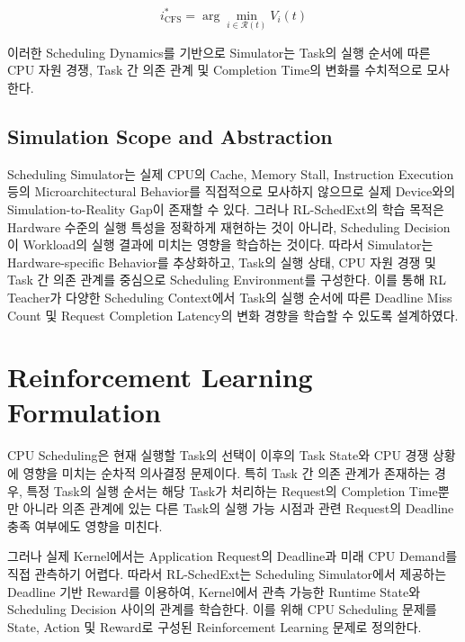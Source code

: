 \begin{equation}
    i^*_{\mathrm{CFS}}
    =
    \arg\min_{i \in \mathcal{R}(t)} V_i(t)
\end{equation}

이러한 Scheduling Dynamics를 기반으로 Simulator는
Task의 실행 순서에 따른 CPU 자원 경쟁, Task 간 의존 관계
및 Completion Time의 변화를 수치적으로 모사한다.

\subsection{Simulation Scope and Abstraction}
\label{sec:design-simulation-scope-and-abstraction}

Scheduling Simulator는 실제 CPU의 Cache, Memory Stall,
Instruction Execution 등의 Microarchitectural Behavior를
직접적으로 모사하지 않으므로 실제 Device와의
Simulation-to-Reality Gap이 존재할 수 있다.
그러나 RL-SchedExt의 학습 목적은 Hardware 수준의
실행 특성을 정확하게 재현하는 것이 아니라,
Scheduling Decision이 Workload의 실행 결과에 미치는
영향을 학습하는 것이다.
따라서 Simulator는 Hardware-specific Behavior를 추상화하고,
Task의 실행 상태, CPU 자원 경쟁 및 Task 간 의존 관계를
중심으로 Scheduling Environment를 구성한다.
이를 통해 RL Teacher가 다양한 Scheduling Context에서
Task의 실행 순서에 따른 Deadline Miss Count 및 Request Completion Latency의
변화 경향을 학습할 수 있도록 설계하였다.

\section{Reinforcement Learning Formulation}
\label{sec:design-reinforcement-learning-formulation}
CPU Scheduling은 현재 실행할 Task의 선택이 이후의
Task State와 CPU 경쟁 상황에 영향을 미치는
순차적 의사결정 문제이다.
특히 Task 간 의존 관계가 존재하는 경우,
특정 Task의 실행 순서는 해당 Task가 처리하는 Request의
Completion Time뿐만 아니라 의존 관계에 있는 다른 Task의 실행 가능 시점과
관련 Request의 Deadline 충족 여부에도 영향을 미친다.

그러나 실제 Kernel에서는 Application Request의 Deadline과
미래 CPU Demand를 직접 관측하기 어렵다.
따라서 RL-SchedExt는 Scheduling Simulator에서 제공하는
Deadline 기반 Reward를 이용하여,
Kernel에서 관측 가능한 Runtime State와
Scheduling Decision 사이의 관계를 학습한다.
이를 위해 CPU Scheduling 문제를 State, Action 및
Reward로 구성된 Reinforcement Learning 문제로 정의한다.

